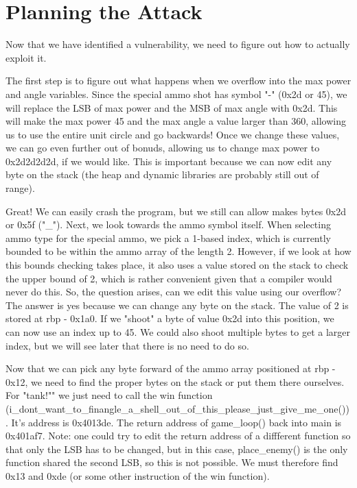 \documentclass{article}
\begin{document}
\section{Planning the Attack}
Now that we have identified a vulnerability, we need to figure out how to actually exploit it. \newline

The first step is to figure out what happens when we overflow into the max power and angle variables. Since the special ammo shot has symbol "-" (0x2d or 45), 
we will replace the LSB of max power and the MSB of max angle with 0x2d. This will make the max power 45 and the max angle a value larger than 360, allowing us to use 
the entire unit circle and go backwards! Once we change these values, we can go even further out of bonuds, allowing us to change max power to 0x2d2d2d2d, if we would like. 
This is important because we can now edit any byte on the stack (the heap and dynamic libraries are probably still out of range). \newline

Great! We can easily crash the program, but we still can allow makes bytes 0x2d or 0x5f ("_"). Next, we look towards the ammo symbol itself. When selecting ammo type for the 
special ammo, we pick a 1-based index, which is currently bounded to be within the ammo array of the length 2. However, if we look at how this bounds checking takes place, it also uses a 
value stored on the stack to check the upper bound of 2, which is rather convenient given that a compiler would never do this. So, the question arises, can we edit this value using our overflow? 
The answer is yes because we can change any byte on the stack. The value of 2 is stored at rbp - 0x1a0. If we "shoot" a byte of value 0x2d into this position, we can now use an index up to 45. 
We could also shoot multiple bytes to get a larger index, but we will see later that there is no need to do so. \newline

Now that we can pick any byte forward of the ammo array positioned at rbp - 0x12, we need to find the proper bytes on the stack or put them there ourselves. For "tank!"" we just 
need to call the win function (i_dont_want_to_finangle_a_shell_out_of_this_please_just_give_me_one()). It's address is 0x4013de. The return address of game_loop() back into main is 0x401af7. 
Note: one could try to edit the return address of a diffferent function so that only the LSB has to be changed, but in this case, place_enemy() is the only function shared the second LSB, so this is not possible. 
We must therefore find 0x13 and 0xde (or some other instruction of the win function). \newline
\end{document}

